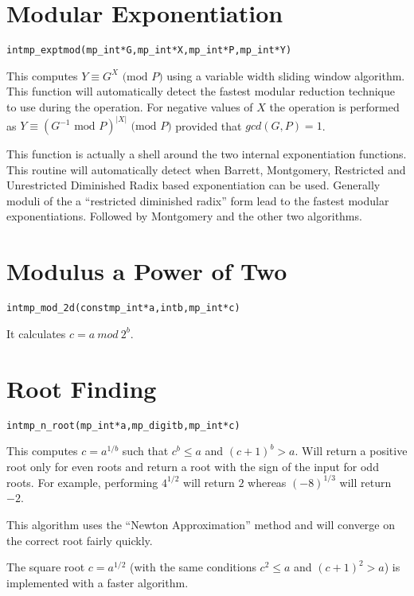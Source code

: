 \documentclass[synpaper]{book}
\def\mod{{\mathit\ mod\ }}
\begin{document}
\section{Modular Exponentiation}
\begin{alltt}
int mp_exptmod (mp_int * G, mp_int * X, mp_int * P, mp_int * Y)
\end{alltt}
This computes $Y \equiv G^X \mbox{ (mod }P\mbox{)}$ using a variable width sliding window algorithm.  This function
will automatically detect the fastest modular reduction technique to use during the operation.  For negative values of
$X$ the operation is performed as $Y \equiv (G^{-1} \mbox{ mod }P)^{\vert X \vert} \mbox{ (mod }P\mbox{)}$ provided that
$gcd(G, P) = 1$.

This function is actually a shell around the two internal exponentiation functions.  This routine will automatically
detect when Barrett, Montgomery, Restricted and Unrestricted Diminished Radix based exponentiation can be used.  Generally
moduli of the a ``restricted diminished radix'' form lead to the fastest modular exponentiations.  Followed by Montgomery
and the other two algorithms.

\section{Modulus a Power of Two}
\begin{alltt}
int mp_mod_2d(const mp_int *a, int b, mp_int *c)
\end{alltt}
It calculates $c = a \mod 2^b$.

\section{Root Finding}
\begin{alltt}
int mp_n_root (mp_int * a, mp_digit b, mp_int * c)
\end{alltt}
This computes $c = a^{1/b}$ such that $c^b \le a$ and $(c+1)^b > a$. Will return a positive root only for even roots and return
a root with the sign of the input for odd roots.  For example, performing $4^{1/2}$ will return $2$ whereas $(-8)^{1/3}$
will return $-2$.

This algorithm uses the ``Newton Approximation'' method and will converge on the correct root fairly quickly.

The square root  $c = a^{1/2}$ (with the same conditions $c^2 \le a$ and $(c+1)^2 > a$) is implemented with a faster algorithm.
\end{document}
